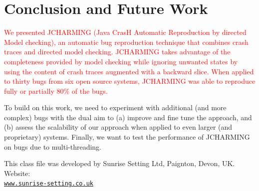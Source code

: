 \documentclass[times]{smrauth}
\newcommand{\red}[1]{\textcolor{red}{#1}}
\begin{document}
\section{Conclusion and Future Work\label{sec:conclusion}}

\red{We presented JCHARMING (Java CrasH Automatic
Reproduction by directed Model checking), an automatic bug
reproduction technique that combines crash traces and
directed model checking. JCHARMING takes advantage of
the completeness provided by model checking while ignoring
unwanted states by using the content of crash traces
augmented with a backward slice. When applied to thirty bugs from six open source systems, JCHARMING was able to
reproduce fully or partially 80\% of the bugs.}

To build on this work, we need to experiment with additional
(and more complex) bugs with the dual aim to (a) improve and
fine tune the approach, and (b) assess the scalability of our
approach when applied to even larger (and proprietary)
systems. Finally, we want to test the performance of
JCHARMING on bugs due to multi-threading.

\ack This class file was developed by Sunrise Setting Ltd,
Paignton, Devon, UK. Website:\\
\href{http://www.sunrise-setting.co.uk}{\texttt{www.sunrise-setting.co.uk}}



\end{document}
